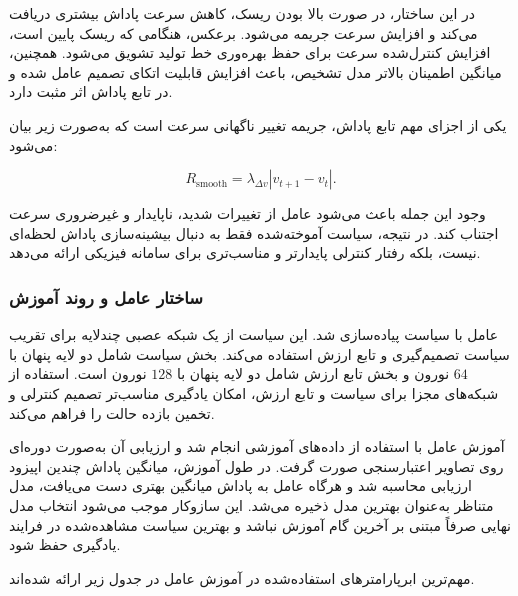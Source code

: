 \documentclass[a4paper, 10pt, twocolumn]{article}
\begin{document}
	در این ساختار، در صورت بالا بودن ریسک، کاهش سرعت پاداش بیشتری دریافت می‌کند و افزایش سرعت جریمه می‌شود. برعکس، هنگامی که ریسک پایین است، افزایش کنترل‌شده سرعت برای حفظ بهره‌وری خط تولید تشویق می‌شود. همچنین، میانگین اطمینان بالاتر مدل تشخیص، باعث افزایش قابلیت اتکای تصمیم عامل شده و در تابع پاداش اثر مثبت دارد.
	
	یکی از اجزای مهم تابع پاداش، جریمه تغییر ناگهانی سرعت است که به‌صورت زیر بیان می‌شود:
	
	\begin{latin}
		\begin{equation}
			R_{\mathrm{smooth}} =
			\lambda_{\Delta v}
			\left|v_{t+1}-v_t\right|.
		\end{equation}
	\end{latin}
	
	وجود این جمله باعث می‌شود عامل از تغییرات شدید، ناپایدار و غیرضروری سرعت اجتناب کند. در نتیجه، سیاست آموخته‌شده فقط به دنبال بیشینه‌سازی پاداش لحظه‌ای نیست، بلکه رفتار کنترلی پایدارتر و مناسب‌تری برای سامانه فیزیکی ارائه می‌دهد.
	
	\subsubsection*{ساختار عامل و روند آموزش}
	
	عامل  با سیاست  پیاده‌سازی شد. این سیاست از یک شبکه عصبی چندلایه برای تقریب سیاست تصمیم‌گیری و تابع ارزش استفاده می‌کند. بخش سیاست شامل دو لایه پنهان با $64$ نورون و بخش تابع ارزش شامل دو لایه پنهان با $128$ نورون است. استفاده از شبکه‌های مجزا برای سیاست و تابع ارزش، امکان یادگیری مناسب‌تر تصمیم کنترلی و تخمین بازده حالت را فراهم می‌کند.
	
	آموزش عامل با استفاده از داده‌های آموزشی انجام شد و ارزیابی آن به‌صورت دوره‌ای روی تصاویر اعتبارسنجی صورت گرفت. در طول آموزش، میانگین پاداش چندین اپیزود ارزیابی محاسبه شد و هرگاه عامل به پاداش میانگین بهتری دست می‌یافت، مدل متناظر به‌عنوان بهترین مدل ذخیره می‌شد. این سازوکار موجب می‌شود انتخاب مدل نهایی صرفاً مبتنی بر آخرین گام آموزش نباشد و بهترین سیاست مشاهده‌شده در فرایند یادگیری حفظ شود.
	
	مهم‌ترین ابرپارامترهای استفاده‌شده در آموزش عامل  در جدول زیر ارائه شده‌اند.
	
\end{document}
